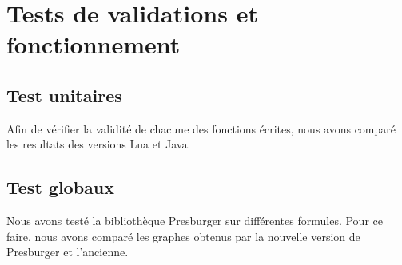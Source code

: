\section{Tests de validations et fonctionnement}

\subsection{Test unitaires}

Afin de vérifier la validité de chacune des fonctions écrites, nous avons comparé les resultats des versions Lua et Java.

\subsection{Test globaux}

Nous avons testé la bibliothèque Presburger sur différentes formules. Pour ce faire, nous avons comparé les graphes obtenus par la nouvelle version de Presburger et l'ancienne.

